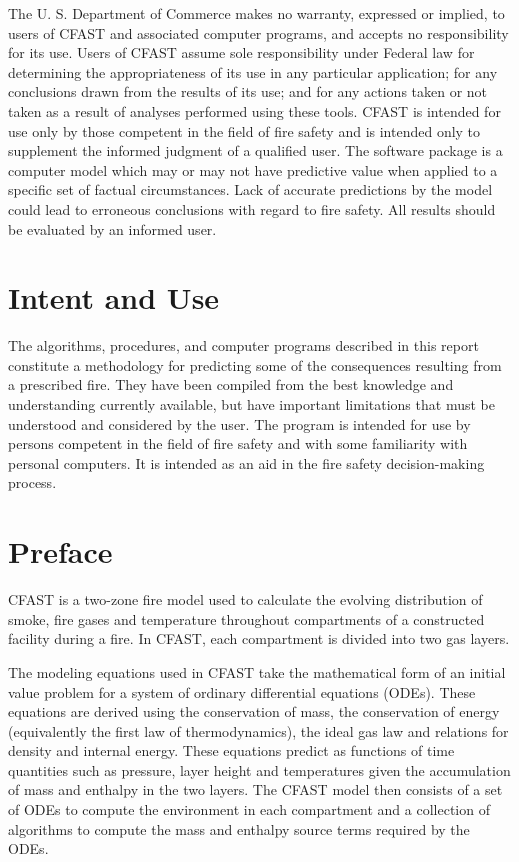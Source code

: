 \documentclass[12pt]{book}
\begin{document}
The U. S. Department of Commerce makes no warranty, expressed or implied, to users of 
CFAST and associated computer programs, and accepts no responsibility for its use.  Users of 
CFAST assume sole responsibility under Federal law for determining the appropriateness of its 
use in any particular application; for any conclusions drawn from the results of its use; and for 
any actions taken or not taken as a result of analyses performed using these tools. 
CFAST is intended for use only by those competent in the field of fire safety and is intended 
only to supplement the informed judgment of a qualified user. The software package is a 
computer model which may or may not have predictive value when applied to a specific set of 
factual circumstances. Lack of accurate predictions by the model could lead to erroneous 
conclusions with regard to fire safety. All results should be evaluated by an informed user.

\chapter{Intent and Use}

The algorithms, procedures, and computer programs described in this report constitute a 
methodology for predicting some of the consequences resulting from a prescribed fire.  They 
have been compiled from the best knowledge and understanding currently available, but have 
important limitations that must be understood and considered by the user.  The program is 
intended for use by persons competent in the field of fire safety and with some familiarity with 
personal computers. It is intended as an aid in the fire safety decision-making process.

\chapter{Preface}

CFAST is a two-zone fire model used to calculate the evolving distribution of smoke, fire gases
and temperature throughout compartments of a constructed facility during a fire. In CFAST,
each compartment is divided into two gas layers.

The modeling equations used in CFAST take the mathematical form of an initial value problem
for a system of ordinary differential equations (ODEs). These equations are derived using the
conservation of mass, the conservation of energy (equivalently the first law of thermodynamics),
the ideal gas law and relations for density and internal energy. These equations predict as
functions of time quantities such as pressure, layer height and temperatures given the
accumulation of mass and enthalpy in the two layers. The CFAST model then consists of a set
of ODEs to compute the environment in each compartment and a collection of algorithms to
compute the mass and enthalpy source terms required by the ODEs.
\end{document}
